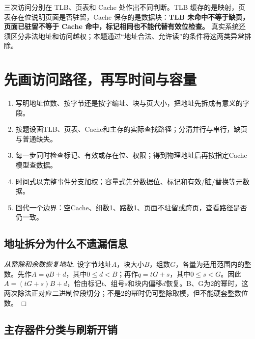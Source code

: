 三次访问分别在 TLB、页表和 Cache 处作出不同判断。TLB 缓存的是映射，页表存在位说明页面是否驻留，Cache 保存的是数据块：\textbf{TLB 未命中不等于缺页，页面已驻留不等于 Cache 命中，标记相同也不能代替有效位检查。} 真实系统还须区分非法地址和访问越权；本题通过``地址合法、允许读''的条件将这两类异常排除。

\section{先画访问路径，再写时间与容量}\label{CO03-method}

\begin{methodbox}[存储系统综合题的顺序]

\begin{enumerate}
\def\labelenumi{\arabic{enumi}.}
\tightlist
\item
  写明地址位数、按字节还是按字编址、块与页大小，把地址先拆成有意义的字段。
\item
  按题设画TLB、页表、Cache和主存的实际查找路径；分清并行与串行，缺页与普通缺失。
\item
  每一步同时检查标记、有效或存在位、权限；得到物理地址后再按指定Cache模型查数据。
\item
  时间式以完整事件分支加权；容量式先分数据位、标记和有效/脏/替换等元数据。
\item
  回代一个边界：空Cache、组数1、路数1、页面不驻留或跨页，查看路径是否仍一致。
\end{enumerate}

\end{methodbox}

\subsection{地址拆分为什么不遗漏信息}\label{CO03-proof}

\begin{proof}[从整除和余数恢复地址]

设字节地址\(A\)，块大小\(B\)，组数\(G\)，各量为适用范围内的整数。先作\(A=qB+d\)，其中\(0\le d<B\)；再作\(q=tG+s\)，其中\(0\le s<G\)。因此\(A=(tG+s)B+d\)，恰由标记\(t\)、组号\(s\)和块内偏移\(d\)恢复。B、G为2的幂时，这两次除法正对应二进制位段切分；不是2的幂时仍可整除取模，但不能硬套整数位数。

\end{proof}

\subsection{主存器件分类与刷新开销}\label{CO03-rom}


